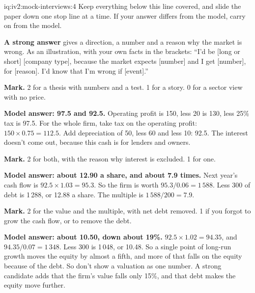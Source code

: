 \begin{solution}{iq:iv2:mock-interviews:4}
Keep everything below this line covered, and slide the paper down one stop line at a time. If your answer differs from the model, carry on from the model.

\ivstop
\textbf{A strong answer} gives a direction, a number and a reason why the market is wrong. As an illustration, with your own facts in the brackets: ``I'd be [long or short] [company type], because the market expects [number] and I get [number], for [reason]. I'd know that I'm wrong if [event].''

\textbf{Mark.} 2 for a thesis with numbers and a test. 1 for a story. 0 for a sector view with no price.

\ivstop
\textbf{Model answer: 97.5 and 92.5.} Operating profit is 150, less 20 is 130, less 25\% tax is 97.5. For the whole firm, take tax on the operating profit: $150 \times 0.75 = 112.5$. Add depreciation of 50, less 60 and less 10: 92.5. The interest doesn't come out, because this cash is for lenders and owners.

\textbf{Mark.} 2 for both, with the reason why interest is excluded. 1 for one.

\ivstop
\textbf{Model answer: about 12.90 a share, and about 7.9 times.} Next year's cash flow is $92.5 \times 1.03 = 95.3$. So the firm is worth $95.3/0.06 = 1\,588$. Less 300 of debt is 1\,288, or 12.88 a share. The multiple is $1\,588/200 = 7.9$.

\textbf{Mark.} 2 for the value and the multiple, with net debt removed. 1 if you forgot to grow the cash flow, or to remove the debt.

\ivstop
\textbf{Model answer: about 10.50, down about 19\%.} $92.5 \times 1.02 = 94.35$, and $94.35/0.07 = 1\,348$. Less 300 is 1\,048, or 10.48. So a single point of long-run growth moves the equity by almost a fifth, and more of that falls on the equity because of the debt. So don't show a valuation as one number. A strong candidate adds that the firm's value falls only 15\%, and that debt makes the equity move further.


\end{solution}
